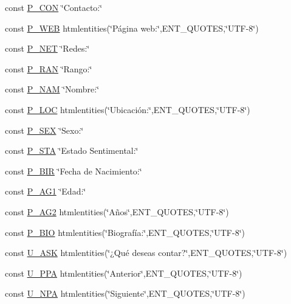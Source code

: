 \begin{DoxyCompactItemize}
\item 
const \hyperlink{lang__ES_8conf_8php_ad3f5472a251165b7eb05aa8e4084a10c}{P\-\_\-\-C\-O\-N} \char`\"{}Contacto\-:\char`\"{}
\item 
const \hyperlink{lang__ES_8conf_8php_ade9836b8897b65809f548b7781e977e2}{P\-\_\-\-W\-E\-B} htmlentities(\char`\"{}Página web\-:\char`\"{},E\-N\-T\-\_\-\-Q\-U\-O\-T\-E\-S,\char`\"{}U\-T\-F-\/8\char`\"{})
\item 
const \hyperlink{lang__ES_8conf_8php_a7b08d18ad2a5adbaae77bea17fd408bf}{P\-\_\-\-N\-E\-T} \char`\"{}Redes\-:\char`\"{}
\item 
const \hyperlink{lang__ES_8conf_8php_a5fca0022c5481060364d39a3812ac604}{P\-\_\-\-R\-A\-N} \char`\"{}Rango\-:\char`\"{}
\item 
const \hyperlink{lang__ES_8conf_8php_a298d6af9ed729c17543a14644e5be675}{P\-\_\-\-N\-A\-M} \char`\"{}Nombre\-:\char`\"{}
\item 
const \hyperlink{lang__ES_8conf_8php_ac5de6ba666c926e6b375d153846010c3}{P\-\_\-\-L\-O\-C} htmlentities(\char`\"{}Ubicación\-:\char`\"{},E\-N\-T\-\_\-\-Q\-U\-O\-T\-E\-S,\char`\"{}U\-T\-F-\/8\char`\"{})
\item 
const \hyperlink{lang__ES_8conf_8php_a695823c4efbb40f67bf068989d78c024}{P\-\_\-\-S\-E\-X} \char`\"{}Sexo\-:\char`\"{}
\item 
const \hyperlink{lang__ES_8conf_8php_a77097762c49f00afdf8fe7fd23b3498c}{P\-\_\-\-S\-T\-A} \char`\"{}Estado Sentimental\-:\char`\"{}
\item 
const \hyperlink{lang__ES_8conf_8php_aef69547e66d1ba07f314ea1c00149ecb}{P\-\_\-\-B\-I\-R} \char`\"{}Fecha de Nacimiento\-:\char`\"{}
\item 
const \hyperlink{lang__ES_8conf_8php_af6b35f13bb73067e81a911449cb0b89b}{P\-\_\-\-A\-G1} \char`\"{}Edad\-:\char`\"{}
\item 
const \hyperlink{lang__ES_8conf_8php_ae0a798c192c8f5a02ae9e12a5ff20c68}{P\-\_\-\-A\-G2} htmlentities(\char`\"{}Años\char`\"{},E\-N\-T\-\_\-\-Q\-U\-O\-T\-E\-S,\char`\"{}U\-T\-F-\/8\char`\"{})
\item 
const \hyperlink{lang__ES_8conf_8php_a333498935f4e2cb6c3904bd31379e25e}{P\-\_\-\-B\-I\-O} htmlentities(\char`\"{}Biografía\-:\char`\"{},E\-N\-T\-\_\-\-Q\-U\-O\-T\-E\-S,\char`\"{}U\-T\-F-\/8\char`\"{})
\item 
const \hyperlink{lang__ES_8conf_8php_aade6029224a1af2dbad53ec0d454186f}{U\-\_\-\-A\-S\-K} htmlentities(\char`\"{}¿Qué deseas contar?\char`\"{},E\-N\-T\-\_\-\-Q\-U\-O\-T\-E\-S,\char`\"{}U\-T\-F-\/8\char`\"{})
\item 
const \hyperlink{lang__ES_8conf_8php_a8980fc01853b6478780875fe230eb9d2}{U\-\_\-\-P\-P\-A} htmlentities(\char`\"{}Anterior\char`\"{},E\-N\-T\-\_\-\-Q\-U\-O\-T\-E\-S,\char`\"{}U\-T\-F-\/8\char`\"{})
\item 
const \hyperlink{lang__ES_8conf_8php_a1a03538e3e8586eb7532f569d9c62a75}{U\-\_\-\-N\-P\-A} htmlentities(\char`\"{}Siguiente\char`\"{},E\-N\-T\-\_\-\-Q\-U\-O\-T\-E\-S,\char`\"{}U\-T\-F-\/8\char`\"{})
\end{DoxyCompactItemize}



